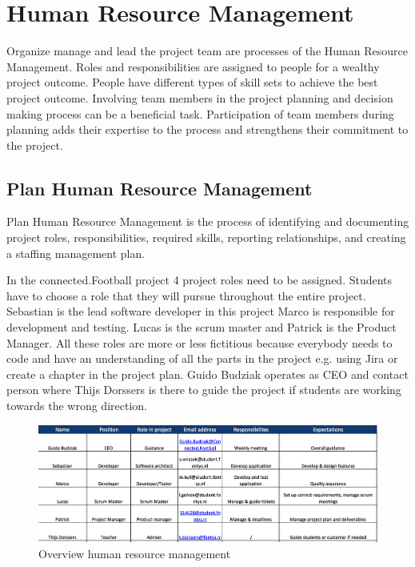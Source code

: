 \section{Human Resource Management}
\label{sec:hrm}
Organize manage and lead the project team are processes of the Human Resource Management. Roles and responsibilities are assigned to people for a wealthy project outcome. People have different types of skill sets to achieve the best project outcome. Involving team members in the project planning and decision making process can be a beneficial task. Participation of team members during
planning adds their expertise to the process and strengthens their commitment to the project.

\subsection{Plan Human Resource Management}
Plan Human Resource Management is the process of identifying and documenting project roles, responsibilities,
required skills, reporting relationships, and creating a staffing management plan.

In the connected.Football project 4 project roles need to be assigned. Students have to choose a role that they will pursue throughout the entire project.
Sebastian is the lead software developer in this project
Marco is responsible for development and testing. Lucas is the scrum master and Patrick is the Product Manager. All these roles are more or less fictitious because everybody needs to code and have an understanding of all the parts in the project e.g. using Jira or create a chapter in the project plan. Guido Budziak operates as CEO and contact person where Thijs Dorssers is there to guide the project if students are working towards the wrong direction.

\begin{figure}[!ht]
  \includegraphics[width=\linewidth]{content/diagram/human/human_resc.png}
  \caption{Overview human resource management}
\end{figure}
\newpage

